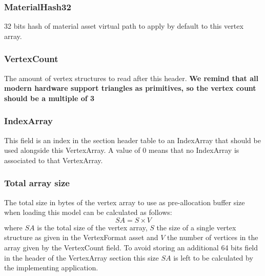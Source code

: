 \subsubsection{MaterialHash32}
32 bits hash of material asset virtual path to apply by default to this vertex array.

\subsubsection{VertexCount}
The amount of vertex structures to read after this header.\newline
\textbf{We remind that all modern hardware support triangles as primitives, so the vertex count should be a multiple of 3}

\subsubsection{IndexArray}
This field is an index in the section header table to an IndexArray that should be used alongside this VertexArray.\newline
A value of $0$ means that no IndexArray is associated to that VertexArray.

\subsubsection{Total array size}
The total size in bytes of the vertex array to use as pre-allocation buffer size when loading this model can be calculated as follows:
\begin{equation}
    SA = S \times V
\end{equation}
where $SA$ is the total size of the vertex array, $S$ the size of a single vertex structure as given in the VertexFormat asset and $V$ the number of vertices in the array given by the VertexCount field.\newline
To avoid storing an additional 64 bits field in the header of the VertexArray section this size $SA$ is left to be calculated by the implementing application.


